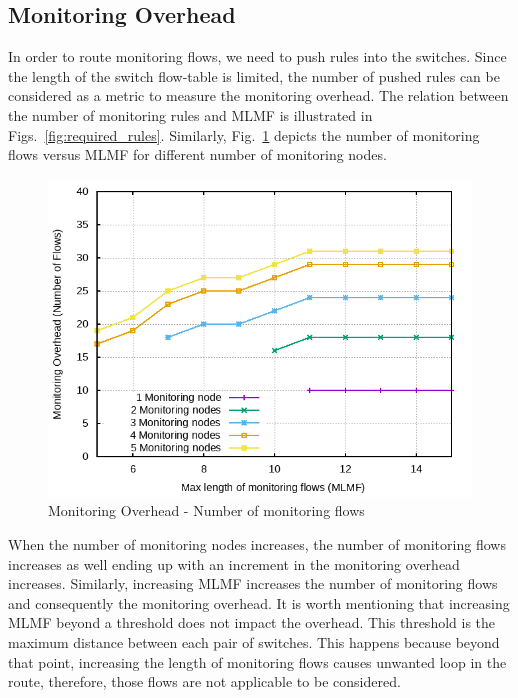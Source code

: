 \documentclass[10pt, journal, letterpaper]{IEEEtran}
\begin{document}
\subsection{Monitoring Overhead}\label{subsec:eval_monitoring_overhead}
In order to route monitoring flows, we need to push rules into the switches. Since the length of the switch flow-table is limited, the number of pushed rules can be considered as a metric to measure the monitoring overhead. The relation between the number of monitoring rules and MLMF is illustrated in Figs.~\ref{fig:required_rules}. Similarly, Fig.~\ref{fig:required_flows} depicts the number of monitoring flows versus MLMF for different number of monitoring nodes. 
\begin{figure}
    \centering
    \includegraphics[width=.8\columnwidth]{img/eval_Abilene_Max_Length_of_Routes_Number_of_Required_Flows.png}
    \caption{Monitoring Overhead - Number of monitoring flows}
    \label{fig:required_flows}
\end{figure}
When the number of monitoring nodes increases, the number of monitoring flows increases as well ending up with an increment in the monitoring overhead increases. Similarly, increasing MLMF increases the number of monitoring flows and consequently the monitoring overhead. It is worth mentioning that increasing MLMF beyond a threshold does not impact the overhead. This threshold is the maximum distance between each pair of switches. This happens because beyond that point, increasing the length of monitoring flows causes unwanted loop in the route, therefore, those flows are not applicable to be considered.
\end{document}
